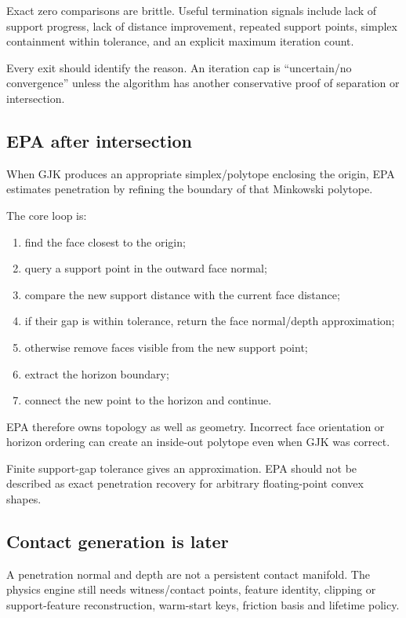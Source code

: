 Exact zero comparisons are brittle. Useful termination signals include lack of support progress, lack of distance improvement, repeated support points, simplex containment within tolerance, and an explicit maximum iteration count.

Every exit should identify the reason. An iteration cap is ``uncertain/no convergence'' unless the algorithm has another conservative proof of separation or intersection.

\subsection{EPA after intersection}\label{epa-after-intersection}

When GJK produces an appropriate simplex/polytope enclosing the origin, EPA estimates penetration by refining the boundary of that Minkowski polytope.

The core loop is:

\begin{enumerate}
\def\labelenumi{\arabic{enumi}.}
\tightlist
\item
  find the face closest to the origin;
\item
  query a support point in the outward face normal;
\item
  compare the new support distance with the current face distance;
\item
  if their gap is within tolerance, return the face normal/depth approximation;
\item
  otherwise remove faces visible from the new support point;
\item
  extract the horizon boundary;
\item
  connect the new point to the horizon and continue.
\end{enumerate}

EPA therefore owns topology as well as geometry. Incorrect face orientation or horizon ordering can create an inside-out polytope even when GJK was correct.

Finite support-gap tolerance gives an approximation. EPA should not be described as exact penetration recovery for arbitrary floating-point convex shapes.

\subsection{Contact generation is later}\label{contact-generation-is-later}

A penetration normal and depth are not a persistent contact manifold. The physics engine still needs witness/contact points, feature identity, clipping or support-feature reconstruction, warm-start keys, friction basis and lifetime policy.

